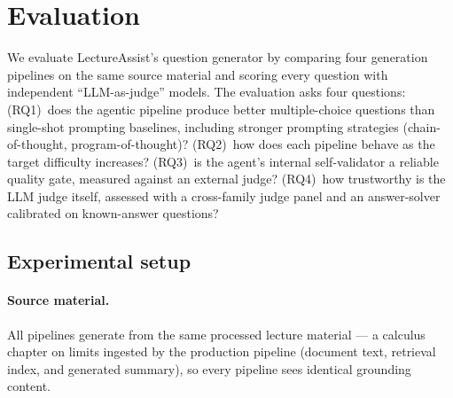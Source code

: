 %

\section{Evaluation}
\label{sec:evaluation}

We evaluate LectureAssist's question generator by comparing four generation
pipelines on the same source material and scoring every question with
independent ``LLM-as-judge'' models. The evaluation asks four questions:
(RQ1)~does the agentic pipeline produce better multiple-choice questions than
single-shot prompting baselines, including stronger prompting strategies
(chain-of-thought, program-of-thought)?
(RQ2)~how does each pipeline behave as the target difficulty increases?
(RQ3)~is the agent's internal self-validator a reliable quality gate, measured
against an external judge?
(RQ4)~how trustworthy is the LLM judge itself, assessed with a cross-family
judge panel and an answer-solver calibrated on known-answer questions?

\subsection{Experimental setup}
\label{sec:eval-setup}

\paragraph{Source material.} All pipelines generate from the same processed
lecture material --- a calculus chapter on limits ingested by the production
pipeline (document text, retrieval index, and generated summary), so every
pipeline sees identical grounding content.

